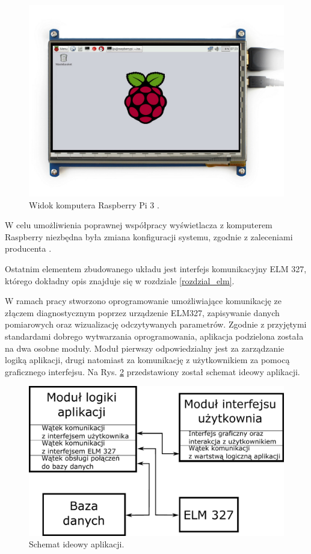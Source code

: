 \documentclass[12pt]{article} %
\numberwithin{equation}{subsection}
\numberwithin{figure}{section}
\numberwithin{table}{section}
\begin{document}
		\begin{figure}[!h]
			\centering
			\includegraphics[scale=0.25]{Images/rys_wyswietlacz.png}
			\caption{Widok komputera Raspberry Pi 3 \cite{wyswietlaczwidok}.}
			\label{rys_wyswietlacz}
		\end{figure}
		W celu umożliwienia poprawnej współpracy wyświetlacza z komputerem Raspberry niezbędna była zmiana konfiguracji systemu, zgodnie z zaleceniami producenta \cite{wyswietlaczconf}.
		
		Ostatnim elementem zbudowanego układu jest interfejs komunikacyjny ELM 327, którego dokładny opis znajduje się w rozdziale \ref{rozdzial_elm}.

\newpage

\hspace{0.5cm}W ramach pracy stworzono oprogramowanie umożliwiające komunikację ze złączem diagnostycznym poprzez urządzenie ELM327, zapisywanie danych pomiarowych oraz wizualizację odczytywanych parametrów. Zgodnie z przyjętymi standardami dobrego wytwarzania oprogramowania, aplikacja podzielona została na dwa osobne moduły. Moduł pierwszy odpowiedzialny jest za zarządzanie logiką aplikacji, drugi natomiast za komunikację z użytkownikiem za pomocą graficznego interfejsu. Na Rys. \ref{rys_ogolny_schemat_aplikacji} przedstawiony został schemat ideowy aplikacji.

		\begin{figure}[!h]
			\centering
			\includegraphics[scale=0.75]{Images/rys_ogolny_schemat_aplikacji.pdf}
			\caption{Schemat ideowy aplikacji.}
			\label{rys_ogolny_schemat_aplikacji}
		\end{figure}
\end{document}
